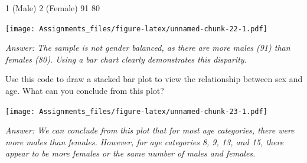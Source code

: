 \documentclass[
]{article}
\newenvironment{Shaded}{\begin{snugshade}}{\end{snugshade}}
\newcommand{\AttributeTok}[1]{\textcolor[rgb]{0.77,0.63,0.00}{#1}}
\newcommand{\CommentTok}[1]{\textcolor[rgb]{0.56,0.35,0.01}{\textit{#1}}}
\newcommand{\ConstantTok}[1]{\textcolor[rgb]{0.00,0.00,0.00}{#1}}
\newcommand{\DecValTok}[1]{\textcolor[rgb]{0.00,0.00,0.81}{#1}}
\newcommand{\FunctionTok}[1]{\textcolor[rgb]{0.00,0.00,0.00}{#1}}
\newcommand{\NormalTok}[1]{#1}
\newcommand{\OtherTok}[1]{\textcolor[rgb]{0.56,0.35,0.01}{#1}}
\newcommand{\SpecialCharTok}[1]{\textcolor[rgb]{0.00,0.00,0.00}{#1}}
\newcommand{\StringTok}[1]{\textcolor[rgb]{0.31,0.60,0.02}{#1}}
\begin{document}
1 (Male) 2 (Female) 91 80

\begin{Shaded}
\end{Shaded}

\texttt{[image: Assignments\_files/figure-latex/unnamed-chunk-22-1.pdf]}

\emph{Answer: The sample is not gender balanced, as there are more males
(91) than females (80). Using a bar chart clearly demonstrates this
disparity.}

Use this code to draw a stacked bar plot to view the relationship
between sex and age. What can you conclude from this plot?

\begin{Shaded}
\end{Shaded}

\texttt{[image: Assignments\_files/figure-latex/unnamed-chunk-23-1.pdf]}

\emph{Answer: We can conclude from this plot that for most age
categories, there were more males than females. However, for age
categories 8, 9, 13, and 15, there appear to be more females or the same
number of males and females.}
\end{document}
